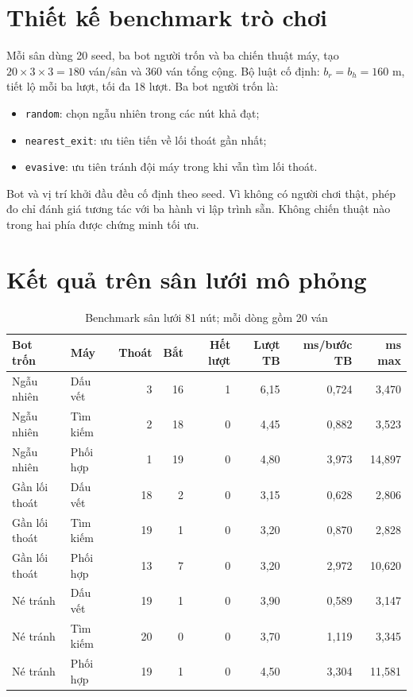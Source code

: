 \section{Thiết kế benchmark trò chơi}

Mỗi sân dùng 20 seed, ba bot người trốn và ba chiến thuật máy, tạo
$20\times3\times3=180$ ván/sân và 360 ván tổng cộng. Bộ luật cố định:
$b_r=b_h=160$ m, tiết lộ mỗi ba lượt, tối đa 18 lượt. Ba bot người trốn là:
\begin{itemize}
  \item \texttt{random}: chọn ngẫu nhiên trong các nút khả đạt;
  \item \texttt{nearest\_exit}: ưu tiên tiến về lối thoát gần nhất;
  \item \texttt{evasive}: ưu tiên tránh đội máy trong khi vẫn tìm lối thoát.
\end{itemize}

Bot và vị trí khởi đầu đều cố định theo seed. Vì không có người chơi thật, phép
đo chỉ đánh giá tương tác với ba hành vi lập trình sẵn. Không chiến thuật nào
trong hai phía được chứng minh tối ưu.

\section{Kết quả trên sân lưới mô phỏng}

\begin{table}[H]
\centering
\small
\caption{Benchmark sân lưới 81 nút; mỗi dòng gồm 20 ván}
\begin{tabular}{llrrrrrr}
\toprule
\textbf{Bot trốn} & \textbf{Máy} & \textbf{Thoát} & \textbf{Bắt} & \textbf{Hết lượt} &
\textbf{Lượt TB} & \textbf{ms/bước TB} & \textbf{ms max} \\
\midrule
Ngẫu nhiên & Dấu vết & 3 & 16 & 1 & 6,15 & 0,724 & 3,470 \\
Ngẫu nhiên & Tìm kiếm & 2 & 18 & 0 & 4,45 & 0,882 & 3,523 \\
Ngẫu nhiên & Phối hợp & 1 & 19 & 0 & 4,80 & 3,973 & 14,897 \\
Gần lối thoát & Dấu vết & 18 & 2 & 0 & 3,15 & 0,628 & 2,806 \\
Gần lối thoát & Tìm kiếm & 19 & 1 & 0 & 3,20 & 0,870 & 2,828 \\
Gần lối thoát & Phối hợp & 13 & 7 & 0 & 3,20 & 2,972 & 10,620 \\
Né tránh & Dấu vết & 19 & 1 & 0 & 3,90 & 0,589 & 3,147 \\
Né tránh & Tìm kiếm & 20 & 0 & 0 & 3,70 & 1,119 & 3,345 \\
Né tránh & Phối hợp & 19 & 1 & 0 & 4,50 & 3,304 & 11,581 \\
\bottomrule
\end{tabular}
\end{table}

